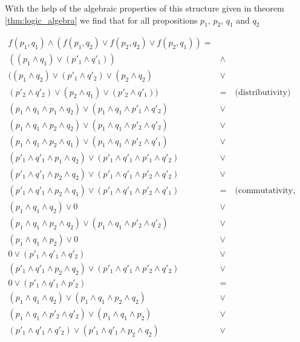 With the help of the algebraic properties of this structure given in theorem \ref{thm:logic_algebra} we find that for all propositions $p_1$, $p_2$, $q_1$ and $q_2$

\begin{align}
f(p_1,q_1)\wedge (f(p_1,q_2)\vee f(p_2,q_2)\vee f(p_2,q_1)) = \nonumber \\ \nonumber
((p_1\wedge q_1)\vee (p'_1 \wedge q'_1))&\wedge \\ \nonumber
((p_1\wedge q_2)\vee (p'_1 \wedge q'_2)\vee(p_2\wedge q_2) &\vee \\ \nonumber
(p'_2 \wedge q'_2)\vee(p_2\wedge q_1)\vee (p'_2 \wedge q'_1))& = \quad\text{(distributivity)}  \\ \nonumber
(p_1\wedge q_1\wedge  p_1\wedge q_2)\vee (p_1\wedge q_1\wedge  p'_1 \wedge q'_2)&\vee \\\nonumber
(p_1\wedge q_1\wedge  p_2\wedge q_2)\vee (p_1\wedge q_1\wedge  p'_2 \wedge q'_2)&\vee \\\nonumber
(p_1\wedge q_1\wedge  p_2\wedge q_1)\vee (p_1\wedge q_1\wedge  p'_2 \wedge q'_1)&\vee \\\nonumber
(p'_1\wedge q'_1\wedge  p_1\wedge q_2)\vee (p'_1\wedge q'_1\wedge  p'_1 \wedge q'_2)&\vee \\\nonumber
(p'_1\wedge q'_1\wedge  p_2\wedge q_2)\vee (p'_1\wedge q'_1\wedge  p'_2 \wedge q'_2)&\vee \\\nonumber
(p'_1\wedge q'_1\wedge  p_2\wedge q_1)\vee (p'_1\wedge q'_1\wedge  p'_2 \wedge q'_1)&= \quad\text{(commutativity, idempotency, complements)}\\\nonumber
(p_1\wedge q_1 \wedge q_2)\vee 0 & \vee \\\nonumber
(p_1\wedge q_1\wedge  p_2\wedge q_2)\vee (p_1\wedge q_1\wedge  p'_2 \wedge q'_2)&\vee \\\nonumber
(p_1\wedge q_1\wedge  p_2)\vee 0 & \vee \\\nonumber
0\vee (p'_1\wedge q'_1 \wedge q'_2) & \vee \\\nonumber
(p'_1\wedge q'_1\wedge  p_2\wedge q_2)\vee (p'_1\wedge q'_1\wedge  p'_2 \wedge q'_2) & \vee\\
0\vee (p'_1\wedge q'_1\wedge  p'_2 )&=  \\ 
(p_1\wedge q_1 \wedge q_2)\vee(p_1\wedge q_1\wedge  p_2\wedge q_2)&\vee\nonumber \\\nonumber
(p_1\wedge q_1\wedge  p'_2 \wedge q'_2)\vee (p_1\wedge q_1\wedge  p_2)&\vee \\\nonumber
(p'_1\wedge q'_1 \wedge q'_2)\vee (p'_1\wedge q'_1\wedge  p_2\wedge q_2)&\vee \\\nonumber

\end{align}
